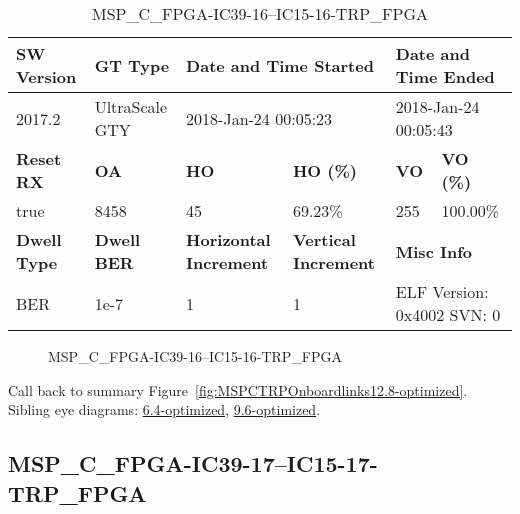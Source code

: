 \begin{table}[h]
\centering
\caption{MSP\_C\_FPGA-IC39-16--IC15-16-TRP\_FPGA}
\label{tab:MSPCFPGAIC3916IC1516TRPFPGA12.8-optimized}
\begin{tabular}{@{}|l|l|l|l|l|l|@{}}
\toprule
\textbf{SW Version}                & \textbf{GT Type}   & \multicolumn{2}{l|}{\textbf{Date and Time Started}}            & \multicolumn{2}{l|}{\textbf{Date and Time Ended}}        \\ \midrule
2017.2                       & UltraScale GTY          & \multicolumn{2}{l|}{2018-Jan-24 00:05:23}                   & \multicolumn{2}{l|}{2018-Jan-24 00:05:43}               \\ \midrule
\textbf{Reset RX}                  & \textbf{OA} & \textbf{HO}   & \textbf{HO (\%)} & \textbf{VO} & \textbf{VO (\%)} \\ \midrule
true & 8458        & 45          & 69.23\%        & 255        & 100.00\%       \\ \midrule
\textbf{Dwell Type}                & \textbf{Dwell BER} & \textbf{Horizontal Increment} & \textbf{Vertical Increment}    & \multicolumn{2}{l|}{\textbf{Misc Info}}                  \\ \midrule
BER                            & 1e-7        & 1        & 1           & \multicolumn{2}{l|}{ELF Version: 0x4002 SVN: 0}                         \\ \bottomrule
\end{tabular}
\end{table}

\begin{figure}[h]
\caption{MSP\_C\_FPGA-IC39-16--IC15-16-TRP\_FPGA} \label{fig:MSPCFPGAIC3916IC1516TRPFPGA12.8-optimized}
\end{figure}

Call back to summary Figure~\ref{fig:MSPCTRPOnboardlinks12.8-optimized}.
Sibling eye diagrams: \hyperref[sec:MSPCFPGAIC3916IC1516TRPFPGA6.4-optimized]{6.4-optimized}, \hyperref[sec:MSPCFPGAIC3916IC1516TRPFPGA9.6-optimized]{9.6-optimized}.

\clearpage
\newpage


\subsection{MSP\_C\_FPGA-IC39-17--IC15-17-TRP\_FPGA}\label{sec:MSPCFPGAIC3917IC1517TRPFPGA12.8-optimized}

